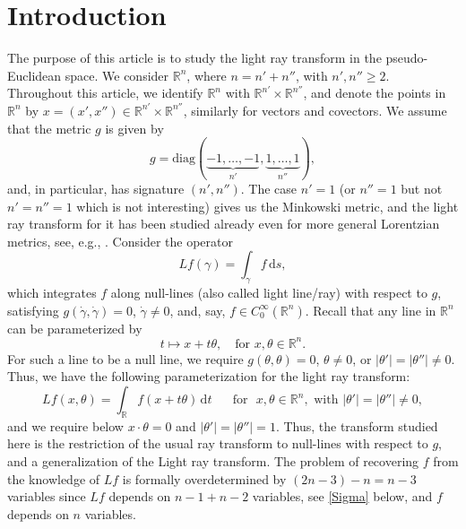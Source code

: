 \documentclass[11pt]{amsart}
\theoremstyle{definition}
\theoremstyle{remark}
\numberwithin{equation}{section}
\newcommand{\Rn}{\mathbb{R}^n}
\newcommand{\rb}{\mathbb{R}}
\renewcommand{\d}{\,\mathrm{d}}
\begin{document}
\section{Introduction}
The purpose of this article is to study the light ray transform in the  pseudo-Euclidean space. We consider  $\rb^{n}$, where $n=n'+n''$, with $n',n'' \geq 2$. Throughout this article, we  identify $\Rn$ with $\rb^{n'} \times \rb^{n''}$, and denote the points in $\rb^{n}$ by $x = (x',x'') \in \rb^{n'} \times \rb^{n''}$, similarly for vectors and covectors. We assume that the metric $g$ is given by
$$
g = \mathrm{diag}(\underbrace{-1, \dots, -1}_{n'}, \underbrace{1, \dots, 1}_{n''}),
$$
and, in particular,   has signature $(n',n'')$. 
The case $n'=1$ (or $n''=1$ but not $n'=n''=1$ which is not interesting) gives us the Minkowski metric, and the light ray transform for it has been studied already even for more general Lorentzian metrics, see, e.g., \cite{MR1004174, Lauri-Light-21,LOSU-Light_Ray, S-support2014, Vasy-Wang-21, wang2017parametrices, SU-book, Yiran-Light-2021}.  
Consider the operator
\begin{equation}
Lf (\gamma) = \int_{\gamma} f \d s,
\end{equation}
which integrates $f$ along null-lines (also called light line/ray) with respect to $g$, satisfying  $g(\dot{\gamma}, \dot{\gamma}) = 0$, $\dot\gamma\not=0$, and, say, $f\in C_0^\infty(\rb^n)$.  Recall that any line in $\rb^{n}$ can be parameterized by 
\begin{equation}
t \mapsto x + t \theta, \quad \text{for } x, \theta \in \Rn.
\end{equation}
For such a line to be a null line, we require $g(\theta, \theta) = 0$, $\theta\not=0$, or $|\theta'| = |\theta''|\not=0$. Thus, we have the following parameterization for the light ray transform:
\begin{equation}\label{def-in}
Lf(x,\theta) = \int_{\rb} f(x+t\theta) \d t \quad \text{~ for ~} x,\theta \in \Rn, \text{~with~} |\theta'| = |\theta''|\not=0,
\end{equation}
and we require below $x\cdot\theta=0$  and  $|\theta'| = |\theta''|=1$. 
Thus, the transform studied here is the restriction of the usual ray transform to null-lines with respect to $g$, and a generalization of the Light ray transform. The problem of recovering $f$ from the knowledge of $Lf$ is formally overdetermined by  $(2n-3)-n=n-3$ variables since $Lf$ depends on $n-1+n-2$ variables, see \eqref{Sigma} below, and $f$ depends on $n$ variables. 
\end{document}
